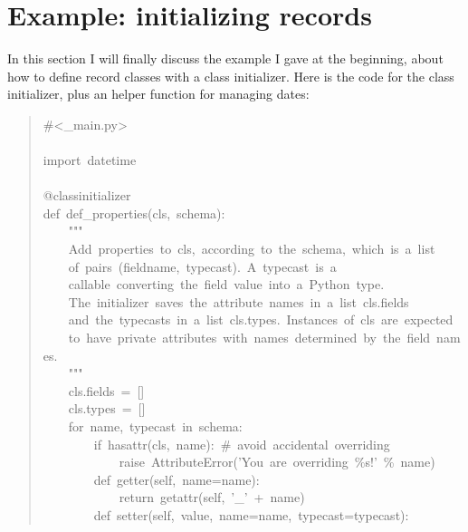\documentclass[10pt,a4paper,english]{article}
\begin{document}

\hypertarget{example-initializing-records}{}
\section*{Example: initializing records}

In this section I will finally discuss the example I gave at the
beginning, about how to define record classes with a class initializer.
Here is the code for the class initializer, plus an helper function
for managing dates:
\begin{quote}{\ttfamily \raggedright \noindent
{\#}<{\_}main.py>~\\
~\\
import~datetime~\\
~\\
@classinitializer~\\
def~def{\_}properties(cls,~schema):~\\
~~~~"{}"{}"~\\
~~~~Add~properties~to~cls,~according~to~the~schema,~which~is~a~list~\\
~~~~of~pairs~(fieldname,~typecast).~A~typecast~is~a~\\
~~~~callable~converting~the~field~value~into~a~Python~type.~\\
~~~~The~initializer~saves~the~attribute~names~in~a~list~cls.fields~\\
~~~~and~the~typecasts~in~a~list~cls.types.~Instances~of~cls~are~expected~\\
~~~~to~have~private~attributes~with~names~determined~by~the~field~names.~\\
~~~~"{}"{}"~\\
~~~~cls.fields~=~{[}{]}~\\
~~~~cls.types~=~{[}{]}~\\
~~~~for~name,~typecast~in~schema:~\\
~~~~~~~~if~hasattr(cls,~name):~{\#}~avoid~accidental~overriding~\\
~~~~~~~~~~~~raise~AttributeError('You~are~overriding~{\%}s!'~{\%}~name)~\\
~~~~~~~~def~getter(self,~name=name):~\\
~~~~~~~~~~~~return~getattr(self,~'{\_}'~+~name)~\\
~~~~~~~~def~setter(self,~value,~name=name,~typecast=typecast):~\\
}
\end{quote}
\end{document}
